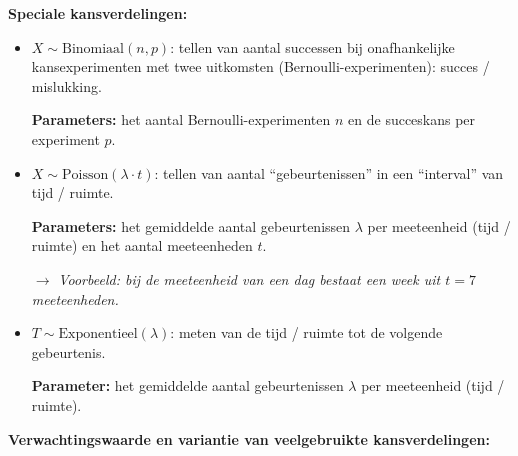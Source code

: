 \textbf{Speciale kansverdelingen:}
\begin{itemize}
    \item $X \sim \text{Binomiaal}(n, p)$: tellen van aantal successen bij onafhankelijke kansexperimenten met twee uitkomsten (Bernoulli-experimenten): succes / mislukking.
    
    {\bfseries Parameters:} het aantal Bernoulli-experimenten $n$ en de succeskans per experiment $p$.
    
    \item $X \sim \text{Poisson}(\lambda \cdot t)$: tellen van aantal ``gebeurtenissen'' in een ``interval'' van tijd / ruimte.
    
    {\bfseries Parameters:} het gemiddelde aantal gebeurtenissen $\lambda$ per meeteenheid (tijd / ruimte) en het aantal meeteenheden $t$.
    
    $\rightarrow$ \emph{Voorbeeld: bij de meeteenheid van een dag bestaat een week uit $t=7$ meeteenheden.} 
    \item $T \sim \text{Exponentieel}(\lambda)$: meten van de tijd / ruimte tot de volgende gebeurtenis.

    {\bfseries Parameter:} het gemiddelde aantal gebeurtenissen $\lambda$ per meeteenheid (tijd / ruimte).  
\end{itemize}
\newpage
\textbf{Verwachtingswaarde en variantie van veelgebruikte kansverdelingen:}

